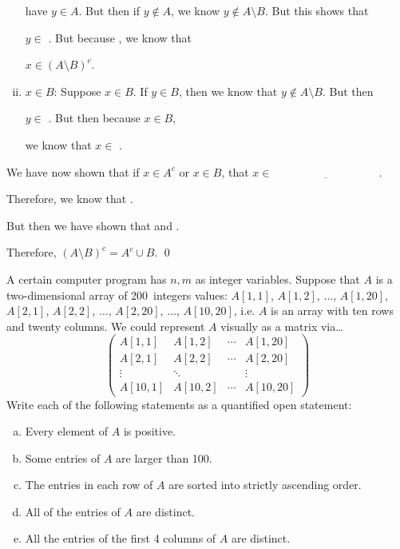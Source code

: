 \documentclass[12pt,letterpaper]{exam}
\begin{document}
\begin{questions}
\begin{enumerate}[(i)]
	have $y \in A$. But then if $y \notin A$, we know $y \notin A \setminus B$. But this shows that \pspace
	
	$y \in$ \underline{\hspace{4cm}}. But because \underline{\hspace{4cm}}, we know that \pspace
	
	$x \in (A \setminus B)^c$. \pspace
	
	\item $x \in B$: Suppose $x \in B$. If $y \in B$, then we know that $y \notin A \setminus B$. But then \pspace
	
	$y \in$ \underline{\hspace{4cm}}. But then because $x \in B$, \newpage
	
	\phantom{.}\pspace
	we know that $x \in$ \underline{\hspace{4cm}}. 
	\end{enumerate} \pspace

We have now shown that if $x \in A^c$ or $x \in B$, that $x \in \underline{\hspace{4cm}}$. \pspace

Therefore, we know that \underline{\hspace{4cm}}. \pspace \pspace

But then we have shown that \underline{\hspace{4cm}} and \underline{\hspace{4cm}}. \pspace

Therefore, $(A \setminus B)^c= A^c \cup B$. \qed



\newpage
\question[10] A certain computer program has $n, m$ as integer variables. Suppose that $A$ is a two-dimensional array of 200~integers values: $A[1, 1]$, $A[1, 2]$, $\ldots$, $A[1, 20]$, $A[2, 1]$, $A[2, 2]$, $\ldots$, $A[2, 20]$, $\ldots$, $A[10, 20]$, i.e. $A$ is an array with ten rows and twenty columns. We could represent $A$ visually as a matrix via\ldots
	\[
	\begin{pmatrix}
	A[1,1] & A[1,2] & \cdots & A[1,20] \\
	A[2,1] & A[2,2] & \cdots & A[2,20] \\
	\vdots & \ddots & & \vdots \\
	A[10,1] & A[10,2] & \cdots & A[10,20]
	\end{pmatrix}
	\]
Write each of the following statements as a quantified open statement:
	\begin{enumerate}[(a)]
	\item Every element of $A$ is positive. 
	\item Some entries of $A$ are larger than 100.
	\item The entries in each row of $A$ are sorted into strictly ascending order.
	\item All of the entries of $A$ are distinct. 
	\item All the entries of the first 4 columns of $A$ are distinct. 
	\end{enumerate}




\end{questions}
\end{document}

